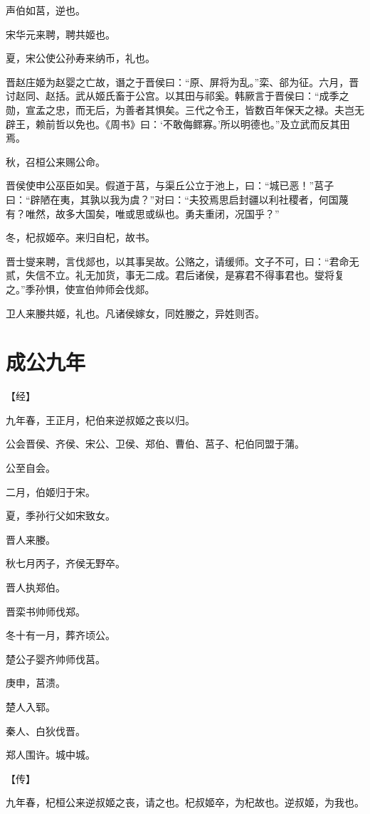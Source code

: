 \documentclass[a4paper,12pt,UTF8,twoside]{ctexbook}
\begin{document}
声伯如莒，逆也。

宋华元来聘，聘共姬也。

夏，宋公使公孙寿来纳币，礼也。

晋赵庄姬为赵婴之亡故，谮之于晋侯曰：“原、屏将为乱。”栾、郤为征。六月，晋讨赵同、赵括。武从姬氏畜于公宫。以其田与祁奚。韩厥言于晋侯曰：“成季之勋，宣孟之忠，而无后，为善者其惧矣。三代之令王，皆数百年保天之禄。夫岂无辟王，赖前哲以免也。《周书》曰：‘不敢侮鳏寡。’所以明德也。”及立武而反其田焉。

秋，召桓公来赐公命。

晋侯使申公巫臣如吴。假道于莒，与渠丘公立于池上，曰：“城已恶！”莒子曰：“辟陋在夷，其孰以我为虞？”对曰：“夫狡焉思启封疆以利社稷者，何国蔑有？唯然，故多大国矣，唯或思或纵也。勇夫重闭，况国乎？”

冬，杞叔姬卒。来归自杞，故书。

晋士燮来聘，言伐郯也，以其事吴故。公赂之，请缓师。文子不可，曰：“君命无贰，失信不立。礼无加货，事无二成。君后诸侯，是寡君不得事君也。燮将复之。”季孙惧，使宣伯帅师会伐郯。

卫人来媵共姬，礼也。凡诸侯嫁女，同姓媵之，异姓则否。


\chapter{成公九年}



【经】

九年春，王正月，杞伯来逆叔姬之丧以归。

公会晋侯、齐侯、宋公、卫侯、郑伯、曹伯、莒子、杞伯同盟于蒲。

公至自会。

二月，伯姬归于宋。

夏，季孙行父如宋致女。

晋人来媵。

秋七月丙子，齐侯无野卒。

晋人执郑伯。

晋栾书帅师伐郑。

冬十有一月，葬齐顷公。

楚公子婴齐帅师伐莒。

庚申，莒溃。

楚人入郓。

秦人、白狄伐晋。

郑人围许。城中城。

【传】

九年春，杞桓公来逆叔姬之丧，请之也。杞叔姬卒，为杞故也。逆叔姬，为我也。
\end{document}
